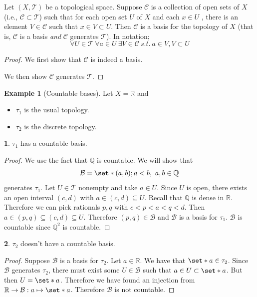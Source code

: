 \documentclass[11pt]{article}
\numberwithin{equation}{section}
\newcounter{theo}[section]\setcounter{theo}{0}
\theoremstyle{definition}
\newtheorem{claim}{\color{ForestGreen}{\textbf{Claim}}}[section]
\theoremstyle{definition}
\newtheorem{example}{\color{WildStrawberry}Example}[section]
\def\Set{\set*}%
\def\ss{\subset}
\def\sse{\subseteq}
\newcommand{\1}{\mathbbm 1}
\def\t{\tau}
\newcommand{\RR}{\mathbb R}
\newcommand{\QQ}{\mathbb Q}
\newcommand{\tT}{\mathcal T}
\newcommand{\bB}{\mathcal B}
\newcommand{\cC}{\mathcal C}
\begin{document}
\begin{lemma}[]
	Let $(X,\tT)$ be a topological space. Suppose $\cC$ is a collection of open sets of $X$ (i.e., $\cC \ss \tT$) such that for each open set $U$ of $X$ and each $x \in U$ , there is an element $V \in \cC$ such that $x \in V \ss U$. Then $\cC$ is a basis for the topology of $X$ (that is, $\cC$ is a basis \emph{and} $\cC$ generates $\tT$). In notation;
	\begin{equation*}
		\forall U \in \tT \ \forall a\in U \ \exists V \in \cC \ s.t. \ a \in V, V \ss U 
	\end{equation*}
	
\end{lemma}
\begin{proof}
	We first show that $\cC$ is indeed a basis. 

	We then show $\cC$ generates $\tT$. 

\end{proof}


\begin{example}[Countable bases]
	Let $X = \RR$ and 
	\begin{itemize}
		\item $\t_1$ is the usual topology.
		\item $\t_2$ is the discrete topology. 
	\end{itemize}

	\begin{claim}
		$\t_1$ has a countable basis.
	\end{claim}
	\begin{proof}
		We use the fact that $\QQ$ is countable. We will show that
		\begin{equation}
			\bB = \Set{(a,b); a<b, \ a,b \in \QQ}
		\end{equation}
		generates $\t_1$. Let $U \in \tT$ nonempty and take $a \in U$. Since $U$ is open, there exists an open interval $(c,d)$ with $a \in (c,d) \sse U$. Recall that $\QQ$ is dense in $\RR$. Therefore we can pick rationals $p,q$ with $c<p<a<q<d$. Then $a \in (p,q) \sse (c,d) \sse U$. Therefore $(p,q) \in \bB$ and $\bB$ is a basis for $\t_1$. $\bB$ is countable since $\QQ^2$ is countable. 
	\end{proof}

	\begin{claim}
		$\t_2$ doesn't have a countable basis. 
	\end{claim}
	\begin{proof}
		Suppose $\bB$ is a basis for $\t_2$. Let $a \in \RR$. We have that $\Set{a} \in \t_2$. Since $\bB$ generates $\t_2$, there must exist some $U \in \bB$ such that $a \in U \ss \Set{a}$. But then $U = \Set{a}$. Therefore we have found an injection from $\RR \to \bB:a \mapsto \Set{a}$. Therefore $\bB$ is not countable. 
	\end{proof}
	
	
	
	
\end{example}
\end{document}
